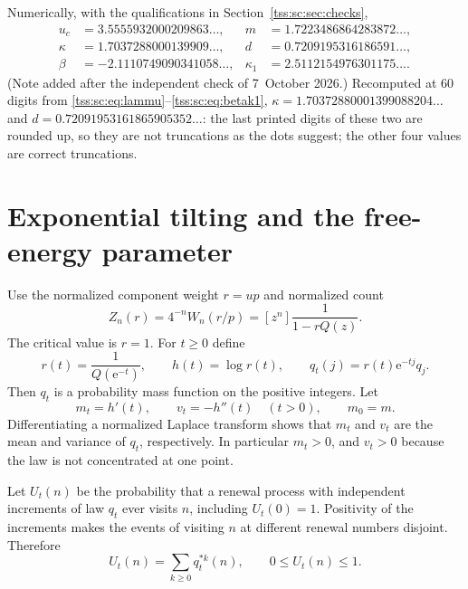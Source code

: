 \documentclass[11pt]{article}
\theoremstyle{remark}\newtheorem{remark}[theorem]{Remark}
\theoremstyle{definition}\newtheorem{definition}[theorem]{Definition}
\newcommand{\e}{\mathrm e}
\begin{document}
Numerically, with the qualifications in Section~\ref{tss:sc:sec:checks},
\begin{equation}\label{tss:sc:eq:decimals}
\begin{aligned}
 u_c&=3.5555932000209863\ldots,&m&=1.7223486864283872\ldots,\\
 \kappa&=1.7037288000139909\ldots,&d&=0.7209195316186591\ldots,\\
 \beta&=-2.1110749090341058\ldots,&\kappa_1&=2.5112154976301175\ldots.
\end{aligned}
\end{equation}
\textup{(Note added after the independent check of 7~October 2026.)}
Recomputed at $60$ digits from \eqref{tss:sc:eq:lammu}--\eqref{tss:sc:eq:betak1},
$\kappa=1.70372880001399088204\ldots$ and $d=0.72091953161865905352\ldots$:
the last printed digits of these two are rounded up, so they are not
truncations as the dots suggest; the other four values are correct
truncations.

\section{Exponential tilting and the free-energy parameter}
\label{tss:sc:sec:tilt}

Use the normalized component weight $r=up$ and normalized count
\begin{equation}\label{tss:sc:eq:Z}
 Z_n(r)=4^{-n}W_n(r/p)=[z^n]\frac1{1-rQ(z)}.
\end{equation}
The critical value is $r=1$. For $t\geq0$ define
\begin{equation}\label{tss:sc:eq:tilt}
 r(t)=\frac1{Q(\e^{-t})},\qquad h(t)=\log r(t),\qquad
 q_t(j)=r(t)\e^{-tj}q_j.
\end{equation}
Then $q_t$ is a probability mass function on the positive integers. Let
\begin{equation}\label{tss:sc:eq:mtvt}
 m_t=h'(t),\qquad v_t=-h''(t)\quad(t>0),\qquad m_0=m.
\end{equation}
Differentiating a normalized Laplace transform shows that $m_t$ and $v_t$ are the mean and variance of $q_t$, respectively. In particular $m_t>0$, and $v_t>0$ because the law is not concentrated at one point.

Let $U_t(n)$ be the probability that a renewal process with independent increments of law $q_t$ ever visits $n$, including $U_t(0)=1$. Positivity of the increments makes the events of visiting $n$ at different renewal numbers disjoint. Therefore
\begin{equation}\label{tss:sc:eq:U}
 U_t(n)=\sum_{k\geq0}q_t^{*k}(n),\qquad 0\leq U_t(n)\leq1.
\end{equation}
\end{document}
